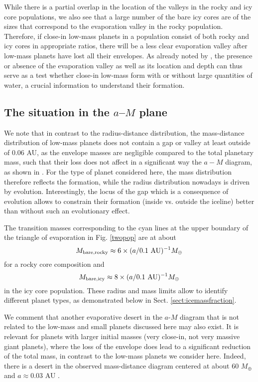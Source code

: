 \documentclass[]{emulateapj}
\def\mearth{M_{\oplus}}
\begin{document}
While there is a partial overlap in the location of the valleys {in the rocky and icy core populations}, we also see that a large number of the bare icy cores are of the sizes that correspond to the evaporation valley in the rocky population. Therefore, if  close-in low-mass planets in a population consist of both rocky and icy cores in appropriate ratios, there will be a less clear evaporation valley after low-mass planets have lost all their envelopes. As already noted by \citet{Lopez2013}, the presence or absence of the evaporation valley as well as its location and depth can thus serve as a test whether close-in low-mass form with or without large quantities of water, a crucial information to understand their formation. 

\subsection{{The situation in the $a$--$M$ plane}}
We note that in contrast to the radius-distance distribution, the mass-distance distribution of low-mass planets does not contain a gap or valley at least outside of 0.06 AU, as the envelope masses are negligible compared to the total planetary mass, such that their loss does not affect in a significant way the $a-M$ diagram, as shown in \citet{Jin2014}. For the type of planet considered here, the mass distribution therefore reflects the formation, while the radius distribution nowadays is driven by evolution. Interestingly, the locus of the gap which is a consequence of evolution allows to constrain their formation (inside vs. outside the iceline) better than without such an evolutionary effect. 

The transition masses corresponding to the cyan lines at the upper boundary of the triangle of evaporation in Fig. \ref{twopop} are at about 
\begin{equation}
M_{\rm bare,rocky}\approx 6\times (a/0.1 \ \mathrm{AU})^{-1} \mearth
\end{equation}
for a rocky core composition and   
\begin{equation}
M_{\rm bare,icy}\approx 8\times (a/0.1 \ \mathrm{AU})^{-1} \mearth
\end{equation}
in the icy core population. These radius and mass limits allow to identify different planet types, as demonstrated below  in Sect. \ref{sect:icemassfraction}. 

We comment that another evaporative desert in the $a$-$M$ diagram that is not related to the low-mass and small planets discussed here may also exist. It is relevant for planets with larger initial masses (very close-in, not very massive giant planets), where the loss of the envelope does lead to a significant reduction of the total mass, in contrast to the low-mass planets we consider here. Indeed, there is a desert in the observed mass-distance diagram centered at about 60 $\mearth$ and $a\approx0.03$ AU  \citep[e.g.,][]{kurokawa2014,mazeh2016}.
\end{document}
